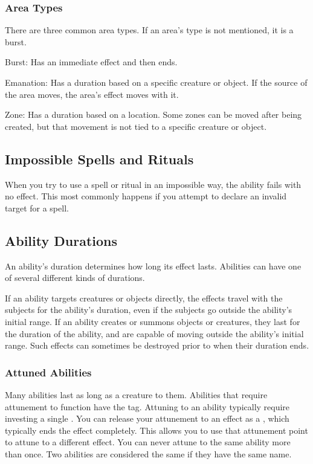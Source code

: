     \subsubsection{Area Types}\label{Area Types}
      There are three common area types.
      If an area's type is not mentioned, it is a burst.
      \begin{raggeditemize}
        \item Burst: Has an immediate effect and then ends.
        \item Emanation: Has a duration based on a specific creature or object. If the source of the area moves, the area's effect moves with it.
        \item Zone: Has a duration based on a location. Some zones can be moved after being created, but that movement is not tied to a specific creature or object.
      \end{raggeditemize}

  \subsection{Impossible Spells and Rituals}
    When you try to use a spell or ritual in an impossible way, the ability fails with no effect.
    This most commonly happens if you attempt to declare an invalid target for a spell.

  \subsection{Ability Durations}\label{Ability Durations}

    An ability's duration determines how long its effect lasts.
    Abilities can have one of several different kinds of durations.

    If an ability targets creatures or objects directly, the effects travel with the subjects for the ability's duration, even if the subjects go outside the ability's initial range.
    If an ability creates or summons objects or creatures, they last for the duration of the ability, and are capable of moving outside the ability's initial range.
    Such effects can sometimes be destroyed prior to when their duration ends.

    \subsubsection{Attuned Abilities}\label{Attuned Abilities}
      Many abilities last as long as a creature  to them.
      Abilities that require attunement to function have the  tag.
      Attuning to an ability typically require investing a single .
      You can release your attunement to an effect as a , which typically ends the effect completely.
      This allows you to use that attunement point to attune to a different effect.
      You can never attune to the same ability more than once.
      Two abilities are considered the same if they have the same name.

